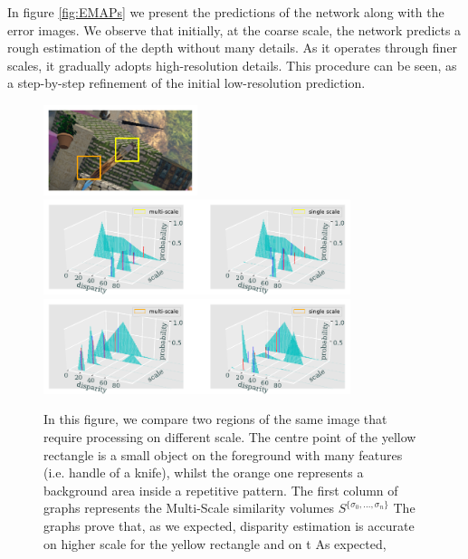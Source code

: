 \documentclass[runningheads]{llncs}
\begin{document}
In figure \ref{fig:EMAPs} we present the predictions of the network along with the error images. We observe that initially, at the coarse scale, the network predicts a rough estimation of the depth without many details. As it operates through finer scales, it gradually adopts high-resolution details. This procedure can be seen, as a step-by-step refinement of the initial low-resolution prediction.

\begin{figure}[htb!]
    \begin{center}
        \includegraphics[width=0.4\textwidth]{paper/latex/figures/multiscale_importance_image_patches.pdf}\\
        \includegraphics[width=0.8\textwidth]{paper/latex/figures/multiscale_importance_graph_high_resolution.pdf}\\
        \includegraphics[width=0.8\textwidth]{figures/multiscale_importance_graph_low_resolution.pdf}
    \end{center}
    
    \caption{In this figure, we compare two regions of the same image that require processing on different scale. The centre point of the yellow rectangle is a small object on the foreground with many features (i.e. handle of a knife), whilst the orange one represents a background area inside a repetitive pattern. The first column of graphs represents the Multi-Scale similarity volumes $S^{\{ \sigma_0, ..., \sigma_n \} }$ The graphs prove that, as we expected, disparity estimation is accurate on higher scale for the yellow rectangle and on t As expected,  }
    \label{fig:multiscale_importance}
\end{figure}
\end{document}
